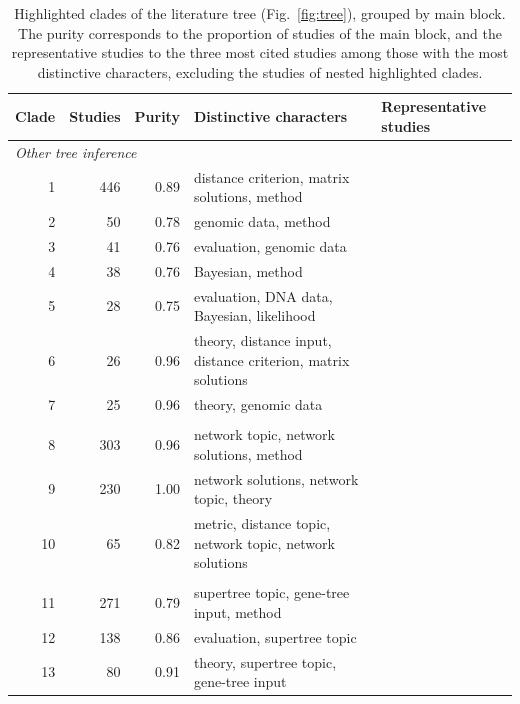 \begin{table}[!htbp]
\centering
\scriptsize
\setlength{\tabcolsep}{3pt}
\caption{Highlighted clades of the literature tree (Fig.~\ref{fig:tree}), grouped by main block. The purity corresponds to the proportion of studies of the main block, and the representative studies to the three most cited studies among those with the most distinctive characters, excluding the studies of nested highlighted clades.}
\label{tab:clades}
\begin{tabular}{rrr>{\raggedright\arraybackslash}p{6.4cm}>{\raggedright\arraybackslash}p{2.6cm}}
\toprule
Clade & Studies & Purity & Distinctive characters & Representative studies\\
\midrule
\multicolumn{5}{l}{\textit{Other tree inference}}\\
1 & 446 & 0.89 & distance criterion, matrix solutions, method & \cite{R02961,R08724,R03607}\\
2 & 50 & 0.78 & genomic data, method & \cite{R07945,R07938,R08016}\\
3 & 41 & 0.76 & evaluation, genomic data & \cite{R03678,R03742,R03719}\\
4 & 38 & 0.76 & Bayesian, method & \cite{R06022,R05720,R03324}\\
5 & 28 & 0.75 & evaluation, DNA data, Bayesian, likelihood & \cite{R03642,R06102,R03622}\\
6 & 26 & 0.96 & theory, distance input, distance criterion, matrix solutions & \cite{R05114,R04150,R02578}\\
7 & 25 & 0.96 & theory, genomic data & \cite{R08160,R08220,R07860}\\
\addlinespace
\multicolumn{5}{l}{\textit{Phylogenetic networks}}\\
8 & 303 & 0.96 & network topic, network solutions, method & \cite{R03325,R06039,R03409}\\
9 & 230 & 1.00 & network solutions, network topic, theory & \cite{R01232,R03701,R02675}\\
10 & 65 & 0.82 & metric, distance topic, network topic, network solutions & \cite{R04146,R04155,R03024}\\
\addlinespace
\multicolumn{5}{l}{\textit{Supertrees and species trees}}\\
11 & 271 & 0.79 & supertree topic, gene-tree input, method & \cite{R05683,R03055,R03058}\\
12 & 138 & 0.86 & evaluation, supertree topic & \cite{R00156,R02705,R03372}\\
13 & 80 & 0.91 & theory, supertree topic, gene-tree input & \cite{R06034,R03695,R03721}\\

\end{tabular}
\end{table}
